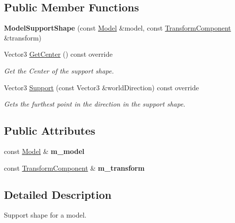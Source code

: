 \subsection*{Public Member Functions}
\begin{DoxyCompactItemize}
\item 
\mbox{\label{classModelSupportShape_a55682df74d6b772a7fe54ff762efbdbe}} 
{\bfseries Model\+Support\+Shape} (const \hyperlink{classModel}{Model} \&model, const \hyperlink{classTransformComponent}{Transform\+Component} \&transform)
\item 
Vector3 \hyperlink{classModelSupportShape_a006fee2a4fca1a9b15194512a072a8e0}{Get\+Center} () const override
\begin{DoxyCompactList}\small\item\em Get the Center of the support shape. \end{DoxyCompactList}\item 
Vector3 \hyperlink{classModelSupportShape_aa15c689024a0e86594fec5461c67f808}{Support} (const Vector3 \&world\+Direction) const override
\begin{DoxyCompactList}\small\item\em Gets the furthest point in the direction in the support shape. \end{DoxyCompactList}\end{DoxyCompactItemize}
\subsection*{Public Attributes}
\begin{DoxyCompactItemize}
\item 
\mbox{\label{classModelSupportShape_a69e766fa6ed67d5d2800a6dcae40679b}} 
const \hyperlink{classModel}{Model} \& {\bfseries m\+\_\+model}
\item 
\mbox{\label{classModelSupportShape_aa75138e5ff4b94d0717a83bf73d9ff7c}} 
const \hyperlink{classTransformComponent}{Transform\+Component} \& {\bfseries m\+\_\+transform}
\end{DoxyCompactItemize}


\subsection{Detailed Description}
Support shape for a model. 

